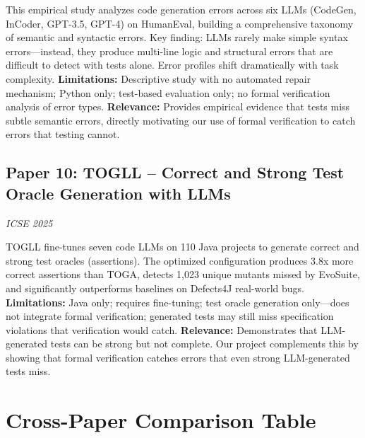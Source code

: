 \documentclass[11pt,a4paper]{article}
\begin{document}
This empirical study analyzes code generation errors across six LLMs (CodeGen, InCoder, GPT-3.5, GPT-4) on HumanEval, building a comprehensive taxonomy of semantic and syntactic errors. Key finding: LLMs rarely make simple syntax errors---instead, they produce multi-line logic and structural errors that are difficult to detect with tests alone. Error profiles shift dramatically with task complexity. \textbf{Limitations:} Descriptive study with no automated repair mechanism; Python only; test-based evaluation only; no formal verification analysis of error types. \textbf{Relevance:} Provides empirical evidence that tests miss subtle semantic errors, directly motivating our use of formal verification to catch errors that testing cannot.

\subsection{Paper 10: TOGLL -- Correct and Strong Test Oracle Generation with LLMs}
\textit{ICSE 2025} \cite{togll2025}

TOGLL fine-tunes seven code LLMs on 110 Java projects to generate correct and strong test oracles (assertions). The optimized configuration produces 3.8x more correct assertions than TOGA, detects 1,023 unique mutants missed by EvoSuite, and significantly outperforms baselines on Defects4J real-world bugs. \textbf{Limitations:} Java only; requires fine-tuning; test oracle generation only---does not integrate formal verification; generated tests may still miss specification violations that verification would catch. \textbf{Relevance:} Demonstrates that LLM-generated tests can be strong but not complete. Our project complements this by showing that formal verification catches errors that even strong LLM-generated tests miss.


\section{Cross-Paper Comparison Table}
\end{document}

